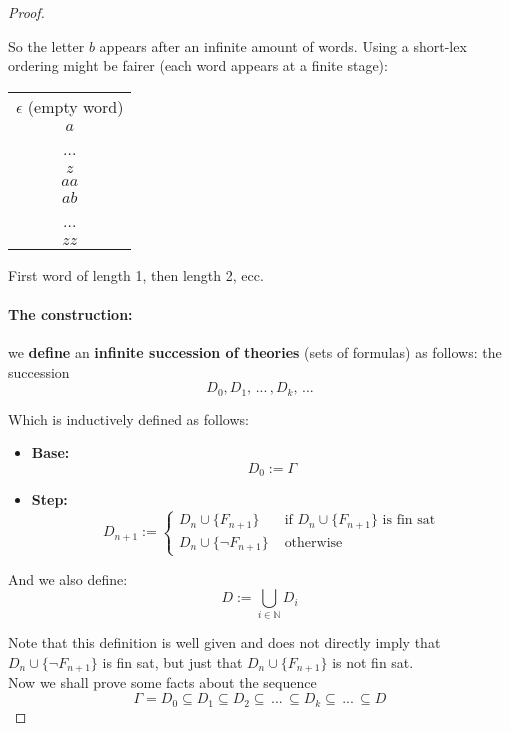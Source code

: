 \begin{proof}
\begin{itemize}
			So the letter $b$ appears after an infinite amount of words. Using a short-lex ordering might be fairer (each word appears at a finite stage):
			\begin{center}
				\begin{tabular}{| c |}
					\hline
					$\epsilon$ (empty word)\\
					$a$\\
					... \\
					$z$ \\
					$aa$\\
					$ab$\\
					...\\
					$zz$\\
					\hline
				\end{tabular}
			\end{center}
			First word of length 1, then length 2, ecc.
		\end{itemize}

		\newpage

		\paragraph{The construction:} we \textbf{define} an \textbf{infinite succession of theories} (sets of formulas) as follows: the succession
		$$ D_0, D_1, \, ... \, , D_k , \, ... $$

		Which is inductively defined as follows:
		\begin{itemize}
			\item \textbf{Base:}
			$$D_0 := \Gamma$$

			\item \textbf{Step:}
			$$ D_{n+1} := \begin{cases}
				D_n \cup \{F_{n+1}\} \; & \text{ if } D_n \cup \{F_{n+1}\} \text{ is fin sat} \\
				D_n \cup \{\neg F_{n+1}\}  & \text{ otherwise }
			\end{cases}
			$$
		\end{itemize}
		And we also define:
		$$ D := \bigcup_{i \in \mathbb{N}} D_i$$

		Note that this definition is well given and does not directly imply that $D_n \cup \{\neg F_{n+1}\}$ is fin sat, but just that $D_n \cup \{F_{n+1}\}$ is not fin sat.\\

		Now we shall prove some facts about the sequence
		$$ \Gamma = D_0 \subseteq D_1 \subseteq D_2 \subseteq \, ... \, \subseteq D_k \subseteq \, ... \, \subseteq D $$


\end{proof}
